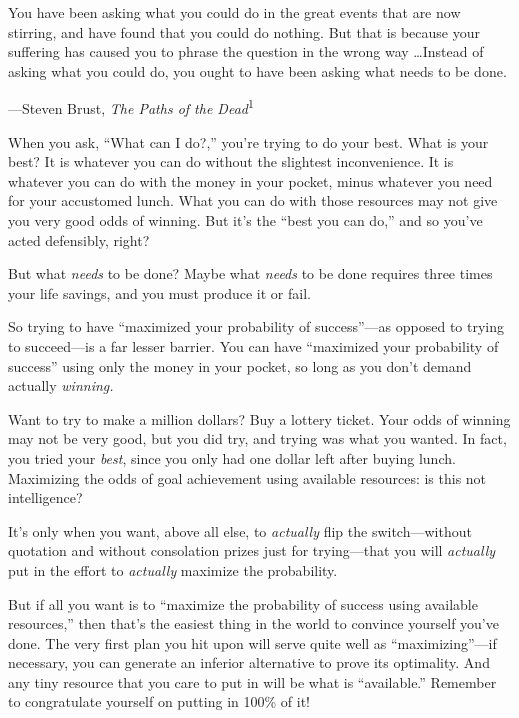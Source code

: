 {
 You have been asking what you could do in the great events that
are now stirring, and have found that you could do nothing. But that is
because your suffering has caused you to phrase the question in the
wrong way \ldots Instead of asking what you could do, you ought to have
been asking what needs to be done.}

{\raggedleft
 {}---Steven Brust, \textit{The Paths of the
Dead}\textsuperscript{1}
\par}


\bigskip

{
 When you ask, ``What can I
do?,'' you're trying to do your best.
What is your best? It is whatever you can do without the slightest
inconvenience. It is whatever you can do with the money in your pocket,
minus whatever you need for your accustomed lunch. What you can do with
those resources may not give you very good odds of winning. But
it's the ``best you can
do,'' and so you've acted defensibly,
right?}

{
 But what \textit{needs} to be done? Maybe what \textit{needs} to
be done requires three times your life savings, and you must produce it
or fail.}

{
 So trying to have ``maximized your probability of
success''---as opposed to trying to succeed---is a
far lesser barrier. You can have ``maximized your
probability of success'' using only the money in your
pocket, so long as you don't demand actually
\textit{winning.}}

{
 Want to try to make a million dollars? Buy a lottery ticket. Your
odds of winning may not be very good, but you did try, and trying was
what you wanted. In fact, you tried your \textit{best}, since you only
had one dollar left after buying lunch. Maximizing the odds of goal
achievement using available resources: is this not intelligence?}

{
 It's only when you want, above all else, to
\textit{actually} flip the switch---without quotation and without
consolation prizes just for trying---that you will \textit{actually}
put in the effort to \textit{actually} maximize the probability.}

{
 But if all you want is to ``maximize the
probability of success using available resources,''
then that's the easiest thing in the world to convince
yourself you've done. The very first plan you hit upon
will serve quite well as
``maximizing''---if necessary, you
can generate an inferior alternative to prove its optimality. And any
tiny resource that you care to put in will be what is
``available.'' Remember to
congratulate yourself on putting in 100\% of it!}

